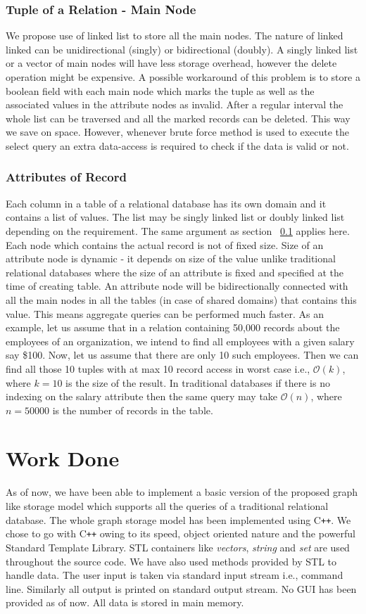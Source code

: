 \documentclass[12pt, oneside]{book}
\begin{document}
\subsection{Tuple of a Relation - Main Node}
\label{sec:tuple}
We propose use of linked list to store all the main nodes. The nature of linked linked can be unidirectional (singly) or bidirectional (doubly). A singly linked list or a vector of main nodes will have less storage overhead, however the delete operation might be expensive. A possible workaround of this problem is to store a boolean field with each main node which marks the tuple as well as the associated values in the attribute nodes as invalid. After a regular interval the whole list can be traversed and all the marked records can be deleted. This way we save on space. However, whenever brute force method is used to execute the select query an extra data-access is required to check if the data is valid or not.
\subsection{Attributes of Record}
Each column in a table of a relational database has its own domain and it contains a list of values. The list may be singly linked list or doubly linked list depending on the requirement. The same argument as section ~\ref{sec:tuple} applies here. Each node which contains the actual record is not of fixed size. Size of an attribute node is dynamic - it depends on size of the value unlike traditional relational databases where the size of an attribute is fixed and specified at the time of creating table. An attribute node will be bidirectionally connected with all the main nodes in all the tables (in case of shared domains) that contains this value. This means aggregate queries can be performed much faster. As an example, let us assume that in a relation containing 50,000 records about the employees of an organization, we intend to find all employees with a given salary say \$100. Now, let us assume that there are only 10 such employees. Then we can find all those 10 tuples with at max 10 record access in worst case i.e., $\mathcal{O}(k)$, where $k = 10$ is the size of the result. In traditional databases if there is no indexing on the salary attribute then the same query may take $\mathcal{O}(n)$, where $n = 50000$ is the number of records in the table.

\chapter{Work Done}
As of now, we have been able to implement a basic version of the proposed graph like storage model which supports all the queries of a traditional relational database. The whole graph storage model has been implemented using C\verb!++!. We chose to go with C\verb!++! owing to its speed, object oriented nature and the powerful Standard Template Library. STL containers like \emph{vectors}, \emph{string} and \emph{set} are used throughout the source code. We have also used methods provided by STL to handle data. The user input is taken via standard input stream i.e., command line. Similarly all output is printed on standard output stream. No GUI has been provided as of now. All data is stored in main memory.
\end{document}
